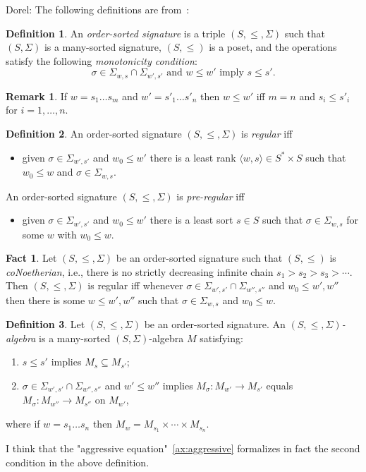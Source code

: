 \documentclass{article}
\newcommand\comment[2]{\par\noindent\color{red}#1: #2\color{black}\par\noindent}
\newcommand\dl{\comment{Dorel}}
\theoremstyle{definition}
\theoremstyle{definition}
\newtheorem{definition}{Definition}[section]
\theoremstyle{definition}
\newtheorem{remark}{Remark}[section]
\theoremstyle{theorem}
\theoremstyle{theorem}
\newtheorem{fact}{Fact}[section]
\theoremstyle{theorem}
\begin{document}
\dl{
The following definitions are from~\cite{osa}:\\
\begin{definition}
An \emph{order-sorted signature} is a triple $(S,\le,\Sigma)$ such that $(S,\Sigma)$ is a many-sorted signature, $(S, \le)$ is a poset, and the operations satisfy the following \emph{monotonicity condition}:
\[
\sigma\in\Sigma_{w,s}\cap\Sigma_{w',s'}\textrm{~and~}w\le w'\textrm{~imply~}s\le s'.
\]
\end{definition}

\begin{remark}
If $w=s_1\ldots s_m$ and $w'=s'_1\ldots s'_n$ then $w\le w'$ iff $m = n$ and $s_i\le s'_i$ for $i=1,\ldots,n$.
\end{remark}

\begin{definition}
An order-sorted signature $(S,\le,\Sigma)$ is \emph{regular} iff
\begin{itemize}
\item given $\sigma\in\Sigma_{w',s'}$ and $w_0\le w'$ there is a least rank $\langle w,s\rangle\in S^*\times S$ such that $w_0\le w$ and $\sigma\in\Sigma_{w,s}$.
\end{itemize}
An order-sorted signature $(S,\le,\Sigma)$ is \emph{pre-regular} iff
\begin{itemize}
\item given $\sigma\in\Sigma_{w',s'}$ and $w_0\le w'$ there is a least sort $s\in S$ such that  $\sigma\in\Sigma_{w,s}$ for some $w$ with $w_0\le w$.
\end{itemize}

\end{definition}

\begin{fact}\cite{osa}\label{fact:reg}
Let  $(S,\le,\Sigma)$ be an order-sorted signature such that $(S,\le)$ is \emph{coNoetherian}, i.e., there is no strictly decreasing infinite chain $s_1>s_2>s_3>\cdots$.
Then $(S,\le,\Sigma)$ is regular iff whenever $\sigma\in \Sigma_{w',s'}\cap\Sigma_{w'',s''}$ and $w_0\le w',w''$ then there is some $w\le w',w''$ such that $\sigma\in\Sigma_{w,s}$ and $w_0\le w$.
\end{fact}

\begin{definition}
Let  $(S,\le,\Sigma)$ be an order-sorted signature. An \emph{ $(S,\le,\Sigma)$-algebra} is a many-sorted $(S,\Sigma)$-algebra $M$ satisfying:
\begin{enumerate}
\item $s\le s'$ implies $M_s\subseteq M_{s'}$;
\item $\sigma\in \Sigma_{w',s'}\cap\Sigma_{w'',s''}$ and $w'\le w''$ implies $M_\sigma:M_{w'}\to M_{s'}$ equals  $M_\sigma:M_{w''}\to M_{s''}$ on $M_{w'}$,
\end{enumerate}
where if $w=s_1\ldots s_n$ then $M_w=M_{s_1}\times\cdots\times M_{s_n}$.
\end{definition}
I think that the "aggressive equation"~\ref{ax:aggressive} formalizes in fact the second condition in the above definition.
}
\end{document}

